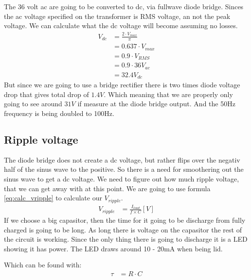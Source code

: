 The 36 volt ac are going to be converted to dc, via fullwave diode bridge. Sinces the ac voltage specified on the transformer is RMS voltage, an not the peak voltage. We can calculate what the dc voltage will become assuming no losses.
\begin{align} \label{eq:calc_vdc}
V_{ dc } &= \frac{ 2 \cdot V_{ max } }{ \pi } \\
         &= 0.637 \cdot V_{ max } \\
         &= 0.9 \cdot V_{ RMS } \\
         &= 0.9 \cdot 36 V_{ac} \nonumber \\
         &= 32.4 V_{ dc } \nonumber
\end{align}
But since we are going to use a bridge rectifier there is two times diode voltage drop that gives total drop of \(1.4V\). Which meaning that we are properly only going to see around \( 31V \) if measure at the diode bridge output. And the 50Hz frequency is being doubled to 100Hz.

\subsection{Ripple voltage}
The diode bridge does not create a dc voltage, but rather flips over the negativ half of the sinus wave to the positive. So there is a need for smoothering out the sinus wave to get a dc voltage. 
We need to figure out how much ripple voltage, that we can get away with at this point. We are going to use formula \ref{eq:calc_vripple} to calculate our $V_{ripple}$.
\begin{align}\label{eq:calc_vripple}
V_{ ripple } &= \frac{ I_{ load } }{ f \times C } [V]
\end{align}
If we choose a big capasitor, then the time for it going to be discharge from fully charged is going to be long. As long there is voltage on the capasitor the rest of the circuit is working. Since the only thing there is going to discharge it is a LED showing it has power. The LED draws around 10 - 20mA when being lid.

Which can be found with:
\begin{align}
\tau &= R \cdot C
\end{align}

